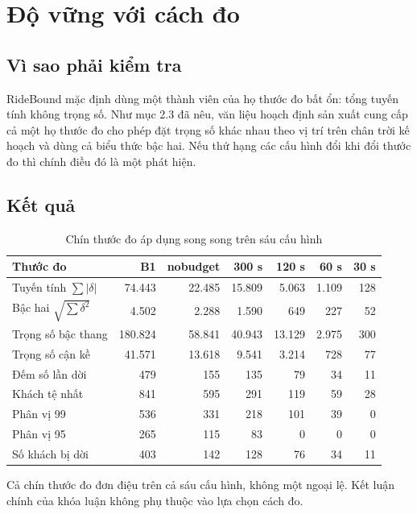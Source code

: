 \section{Độ vững với cách đo}
\label{muc:dovung}

\subsection{Vì sao phải kiểm tra}

RideBound mặc định dùng một thành viên của họ thước đo bất ổn: tổng tuyến tính không trọng số.
Như mục 2.3 đã nêu, văn liệu hoạch định sản xuất cung cấp cả một họ thước đo cho phép đặt trọng
số khác nhau theo vị trí trên chân trời kế hoạch và dùng cả biểu thức bậc hai. Nếu thứ hạng các
cấu hình đổi khi đổi thước đo thì chính điều đó là một phát hiện.

\subsection{Kết quả}

\begin{table}[htbp]
\centering
\caption{Chín thước đo áp dụng song song trên sáu cấu hình}
\label{bang:chinthuoc}
\footnotesize
\begin{tabular}{@{}lrrrrrr@{}}
\toprule
\textbf{Thước đo} & \textbf{B1} & \textbf{nobudget} & \textbf{300 s} & \textbf{120 s} & \textbf{60 s} & \textbf{30 s}\\
\midrule
Tuyến tính $\sum|\delta|$ & 74.443 & 22.485 & 15.809 & 5.063 & 1.109 & 128\\
Bậc hai $\sqrt{\sum \delta^2}$ & 4.502 & 2.288 & 1.590 & 649 & 227 & 52\\
Trọng số bậc thang & 180.824 & 58.841 & 40.943 & 13.129 & 2.975 & 300\\
Trọng số cận kề & 41.571 & 13.618 & 9.541 & 3.214 & 728 & 77\\
Đếm số lần dời & 479 & 155 & 135 & 79 & 34 & 11\\
Khách tệ nhất & 841 & 595 & 291 & 119 & 59 & 28\\
Phân vị 99 & 536 & 331 & 218 & 101 & 39 & 0\\
Phân vị 95 & 265 & 115 & 83 & 0 & 0 & 0\\
Số khách bị dời & 403 & 142 & 128 & 76 & 34 & 11\\
\bottomrule
\end{tabular}
\end{table}

Cả chín thước đo đơn điệu trên cả sáu cấu hình, không một ngoại lệ. Kết luận chính của khóa luận
không phụ thuộc vào lựa chọn cách đo.

